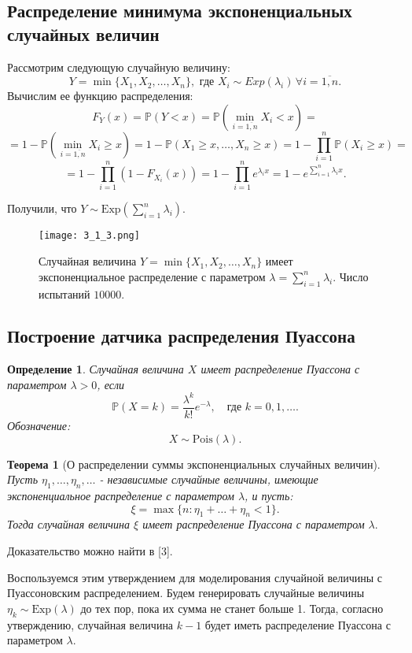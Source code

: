 \documentclass[a4paper, 11pt]{article}
\theoremstyle{def}
\newtheorem{definition}{Определение}[section]
\theoremstyle{th}
\newtheorem{theorem}{Теорема}[section]
\theoremstyle{rem}
\newcommand{\p}{\mathbb{P}}
\begin{document}
\subsection{Распределение минимума экспоненциальных случайных величин}
Рассмотрим следующую случайную величину:
$$Y = \min\{X_1, X_2, \dots, X_n\}, \text{ где } X_i\sim Exp(\lambda_i) \, \forall i = \overline{1, n}.$$
Вычислим ее функцию распределения:
$$F_Y(x) = \p(Y < x) = \p(\min_{i = \overline{1, n}}{X_i} < x) = $$
$$ = 1 - \p(\min_{i = \overline{1, n}}{X_i} \geqslant x) = 1 - \p(X_1 \geqslant x, \dots, X_n \geqslant x) = 1 - \prod\limits_{i = 1}^{n}\p(X_i \geqslant x) = $$
$$= 1 - \prod\limits_{i = 1}^{n}(1 - F_{X_i}(x)) = 1 - \prod\limits_{i = 1}^{n}e^{\lambda_i x} = 1 - e^{\sum\limits_{i=1}^n \lambda_i x}.$$

Получили, что $Y \sim \mbox{Exp}\left(\sum\limits_{i=1}^n\lambda_i\right).$
\begin{figure}[H]
        \centering
        \texttt{[image: 3\_1\_3.png]}
        \caption{Случайная величина $Y = \min\{X_1, X_2, \dots, X_n\}$ имеет экспоненциальное распределение с параметром $\lambda = \sum\limits_{i=1}^n\lambda_i$. Число испытаний $10000$.}
\end{figure}
\subsection{Построение датчика распределения Пуассона}

\begin{definition}
        Случайная величина $X$ \textit{имеет распределение Пуассона с параметром $\lambda > 0$}, если
$$
        \p(X = k) = \frac{\lambda^k}{k!} e^{-\lambda},
        \quad
        \mbox{где } k = 0, 1, \ldots.
$$
Обозначение:
$$
        X \sim \mbox{Pois}(\lambda).
$$
\end{definition}

\begin{theorem}[О распределении суммы экспоненциальных случайных величин]
    Пусть $\eta_1, \ldots, \eta_n, \ldots$ - независимые случайные величины, имеющие экспоненциальное распределение с параметром $\lambda$, и пусть:
    $$
    \xi = \max{\{n: \eta_1 + \ldots + \eta_n < 1\}}.
    $$
    Тогда случайная величина $\xi$ имеет распределение Пуассона с параметром $\lambda.$ 
\end{theorem}
Доказательство можно найти в [3].

Воспользуемся этим утверждением для моделирования случайной величины с Пуассоновским распределением.
Будем генерировать случайные величины $\eta_k \sim \mbox{Exp}(\lambda)$ до тех пор, пока их сумма не станет больше 1. Тогда, согласно утверждению, случайная величина $k-1$ будет иметь распределение Пуассона с параметром $\lambda$. 
\end{document}
